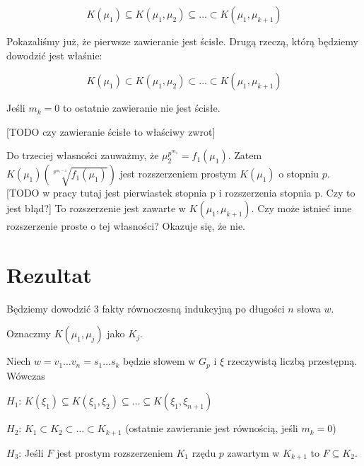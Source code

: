 \[
  K\left(\mu_1\right) \subseteq
  K\left(\mu_1, \mu_2\right) \subseteq
  \ldots \subset
  K\left(\mu_1, \mu_{k+1}\right)
\]

Pokazaliśmy już, że pierwsze zawieranie jest ścisłe. Drugą rzeczą, którą
będziemy dowodzić jest właśnie:

\begin{equation}
  K(\mu_1) \subset
  K(\mu_1, \mu_2) \subset
  \ldots \subset
  K(\mu_1, \mu_{k+1})
  \label{eq:strict_tower}
\end{equation}

Jeśli $m_k = 0$ to ostatnie zawieranie nie jest ścisłe.

[TODO czy zawieranie ścisłe to właściwy zwrot]

Do trzeciej własności zauważmy, że $\mu_2^{p^{m_1}} = f_1\left(\mu_1\right)$.
Zatem $K\left(\mu_1\right)\left(\sqrt[p^{m_1 -
1}]{f_1\left(\mu_1\right)}\right)$ jest rozszerzeniem prostym
$K\left(\mu_1\right)$ o stopniu $p$.
[TODO w pracy tutaj jest pierwiastek stopnia p i rozszerzenia stopnia p. Czy to
jest błąd?]
To rozszerzenie jest zawarte w $K\left(\mu_1, \mu_{k+1}\right)$. Czy może
istnieć inne rozszerzenie proste o tej własności? Okazuje się, że nie.

\section{Rezultat}

Będziemy dowodzić 3 fakty równoczesną indukcyjną po długości $n$ słowa $w$.

Oznaczmy $K\left(\mu_1, \mu_j\right)$ jako $K_j$.

\begin{theorem}
  Niech $w = v_1 \ldots v_n = s_1 \ldots s_k$ będzie słowem w $G_p$ i $\xi$
  rzeczywistą liczbą przestępną. Wówczas

  \begin{description}
    \item{$H_1$:} 
      $K\left(\xi_1\right)\subseteq
      K\left(\xi_1, \xi_2\right)\subseteq
      \ldots \subseteq
      K\left(\xi_1, \xi_{n+1}\right)$
    \item{$H_2$:}
      $K_1 \subset K_2 \subset \ldots \subset K_{k+1}$ (ostatnie zawieranie jest
      równością, jeśli $m_k = 0$)
    \item{$H_3$:}
      Jeśli $F$ jest prostym rozszerzeniem $K_1$ rzędu $p$  zawartym w $K_{k+1}$
      to $F \subseteq K_2$.
  \end{description}
  \label{th:hypothesis_h}
\end{theorem}

